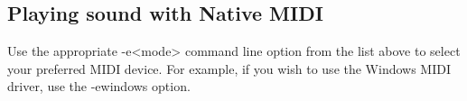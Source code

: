 

\subsection{Playing sound with Native MIDI}
Use the appropriate -e<mode> command line option from the list above to
select your preferred MIDI device. For example, if you wish to use the
Windows MIDI driver, use the -ewindows option.
